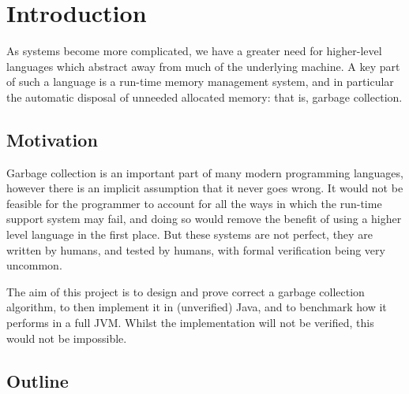 \chapter{Introduction}

As systems become more complicated, we have a greater need for
higher-level languages which abstract away from much of the underlying
machine. A key part of such a language is a run-time memory management
system, and in particular the automatic disposal of unneeded allocated
memory: that is, garbage collection.

\section{Motivation}

Garbage collection is an important part of many modern programming
languages, however there is an implicit assumption that it never goes
wrong. It would not be feasible for the programmer to account for all
the ways in which the run-time support system may fail, and doing so
would remove the benefit of using a higher level language in the first
place. But these systems are not perfect, they are written by humans,
and tested by humans, with formal verification being very uncommon.

The aim of this project is to design and prove correct a garbage
collection algorithm, to then implement it in (unverified) Java, and
to benchmark how it performs in a full JVM. Whilst the implementation
will not be verified, this would not be impossible.

\section{Outline}

